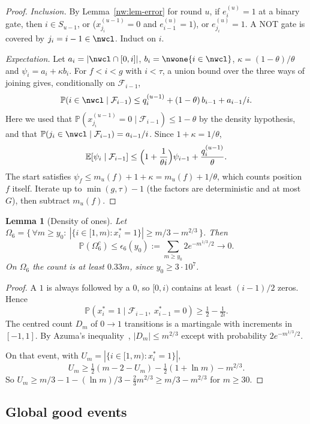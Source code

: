 \documentclass[11pt]{amsart}
\newtheorem{lemma}[theorem]{Lemma}
\theoremstyle{definition}
\theoremstyle{remark}
\newcommand{\PP}{\mathbb{P}}
\newcommand{\EE}{\mathbb{E}}
\newcommand{\cF}{\mathcal{F}}
\begin{document}
\begin{proof}
\emph{Inclusion.} By Lemma~\ref{nw:lem-error} for round $u$, if
$e^{(u)}_i=1$ at a binary gate, then $i\in S_{u-1}$, or
($x^{(u-1)}_{j_i}=0$ and $e^{(u)}_{i-1}=1$), or $e^{(u)}_{j_i}=1$. A NOT gate
is covered by $j_i=i-1\in\nwcl$. Induct on $i$.

\emph{Expectation.} Let $a_i=|\nwcl\cap[0,i]|$, $b_i=\nwone\{i\in\nwcl\}$,
$\kappa=(1-\theta)/\theta$ and $\psi_i=a_i+\kappa b_i$. For $f<i<g$ with
$i<\tau$, a union bound over the three ways of joining gives, conditionally on
$\cF_{i-1}$,
\[
  \PP(i\in\nwcl\mid\cF_{i-1})\le q^{(u-1)}_i+(1-\theta)\,b_{i-1}+a_{i-1}/i.
\]
Here we used that $\PP(x^{(u-1)}_{j_i}=0\mid\cF_{i-1})\le1-\theta$ by the
density hypothesis, and that $\PP(j_i\in\nwcl\mid\cF_{i-1})=a_{i-1}/i$. Since
$1+\kappa=1/\theta$,
\[
  \EE[\psi_i\mid\cF_{i-1}]\le\Bigl(1+\frac1{\theta i}\Bigr)\psi_{i-1}
  +\frac{q^{(u-1)}_i}{\theta}.
\]
The start satisfies $\psi_f\le m_u(f)+1+\kappa=m_u(f)+1/\theta$, which counts
position $f$ itself. Iterate up to $\min(g,\tau)-1$ (the factors are
deterministic and at most $G$), then subtract $m_u(f)$.
\end{proof}

\begin{lemma}[Density of ones]\label{nw:lem-density}
Let
$\Omega_6=\{\,\forall m\ge y_0:\ |\{i\in[1,m):x^*_i=1\}|\ge m/3-m^{2/3}\,\}$.
Then
\[
  \PP(\Omega_6^c)\le\epsilon_6(y_0):=\sum_{m\ge y_0}2e^{-m^{1/3}/2}\to0.
\]
On $\Omega_6$ the count is at least $0.33m$, since $y_0\ge3\cdot10^7$.
\end{lemma}

\begin{proof}
A $1$ is always followed by a $0$, so $[0,i)$ contains at least $(i-1)/2$
zeros. Hence
\[
  \PP(x^*_i=1\mid\cF_{i-1},\ x^*_{i-1}=0)\ge\tfrac12-\tfrac1{2i}.
\]
The centred count $D_m$ of $0\to1$ transitions is a martingale with
increments in $[-1,1]$. By Azuma's inequality~\cite{nw-azuma67},
$|D_m|\le m^{2/3}$ except with probability $2e^{-m^{1/3}/2}$.

On that event, with $U_m=|\{i\in[1,m):x^*_i=1\}|$,
\[
  U_m\ge\tfrac12(m-2-U_m)-\tfrac12(1+\ln m)-m^{2/3}.
\]
So $U_m\ge m/3-1-(\ln m)/3-\tfrac23m^{2/3}\ge m/3-m^{2/3}$ for $m\ge30$.
\end{proof}

\subsection{Global good events}\label{nw:sec-global}
\end{document}
